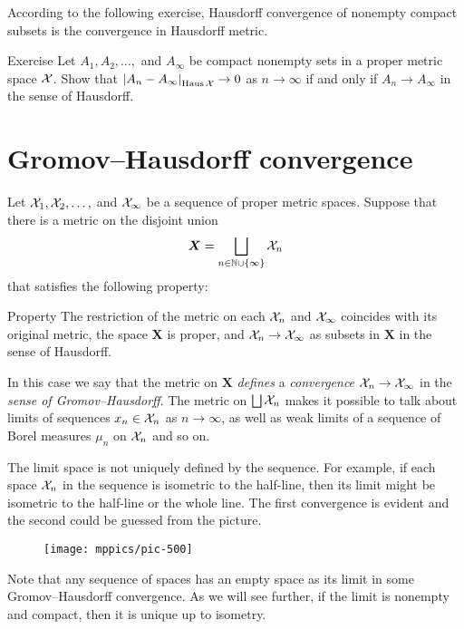 According to the following exercise, Hausdorff convergence of nonempty compact subsets is the convergence in Hausdorff metric.

\begin{thm}{Exercise}\label{ex:Haus-conv}
Let $A_1,A_2,\dots,$ and $A_\infty$ be compact nonempty sets in a proper metric space $\mathcal{X}$.
Show that $|{A_n}-{A_\infty}|_{\operatorname{\rm Haus}\nolimits\mathcal{X}}^{{}}\to 0$ as $n\to\infty$
if and only if $A_n\to A_\infty$ in the sense of Hausdorff.
\end{thm}

\section{Gromov--Hausdorff convergence}\label{sec:Gromov--Hausdorff}

Let $\mathcal{X}_1,\mathcal{X}_2,\dots,$ and $\mathcal{X}_\infty$ be a sequence of proper metric spaces.
Suppose that there is a metric on the disjoint union 
\[\bm{X}=\bigsqcup_{n\in \mathbb{N}\cup\{\infty\}} \mathcal{X}_n\] 
that satisfies the following property:

\begin{thm}{Property}\label{propery:GH}
The restriction of the metric on each $\mathcal{X}_n$ and $\mathcal{X}_\infty$ coincides with its original metric,
the space $\bm{X}$ is proper,
and $\mathcal{X}_n\to \mathcal{X}_\infty$ as subsets in $\bm{X}$ in the sense of Hausdorff.
\end{thm}

In this case we say that the metric on $\bm{X}$ \textit{defines} a \emph{convergence} $\mathcal{X}_n\to \mathcal{X}_\infty$ in the {}\emph{sense of Gromov--Hausdorff}.
The metric on  $\bigsqcup \mathcal{X}_n$ makes it possible to talk about limits of sequences $x_n\in \mathcal{X}_n$ as $n\to\infty$, as well as weak limits of a sequence of Borel measures $\mu_n$ on $\mathcal{X}_n$ and so on.

The limit space is not uniquely defined by the sequence.
For example, if each space $\mathcal{X}_n$ in the sequence is isometric to the half-line, then its limit might be isometric to the half-line or the whole line.
The first convergence is evident and the second could be guessed from the picture.

\begin{figure}[ht!]
\vskip-0mm
\centering
\texttt{[image: mppics/pic-500]}
\end{figure}

Note that any sequence of spaces has an empty space as its limit in some  Gromov--Hausdorff convergence.
As we will see further, if the limit is nonempty and compact, then it is unique up to isometry.

